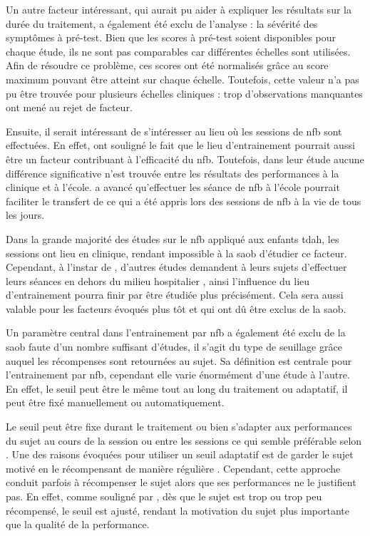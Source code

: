 Un autre facteur intéressant, qui aurait pu aider à expliquer les résultats sur la durée du traitement, a 
également été exclu de l'analyse : la sévérité des symptômes à pré-test. Bien que les scores à pré-test soient disponibles pour chaque étude, ils ne sont pas
comparables car différentes échelles sont utilisées. Afin de résoudre ce problème, ces scores ont été normalisés grâce au score maximum pouvant être atteint
sur chaque échelle. Toutefois, cette valeur n'a pas pu être trouvée pour plusieurs échelles cliniques : trop d'observations manquantes ont mené au rejet de facteur.

Ensuite, il serait intéressant de s'intéresser au lieu où les sessions de \gls{nfb} sont effectuées. En effet, \citet{Minder2018} ont souligné le fait que le lieu
d'entrainement pourrait aussi être un facteur contribuant à l'efficacité du \gls{nfb}. Toutefois, dans leur étude aucune différence significative 
n'est trouvée entre les résultats des performances à la clinique et à l'école. \citet{Vernon2004} a avancé qu'effectuer les séance de \gls{nfb} à l'école
pourrait faciliter le transfert de ce qui a été appris lors des sessions de \gls{nfb} à la vie de tous les jours.

Dans la grande majorité des études sur le \gls{nfb} appliqué aux enfants
\gls{tdah}, les sessions ont lieu en clinique, rendant impossible à la \gls{saob} d'étudier ce facteur. Cependant, à l'instar de \citet{Steiner2014, Minder2018}, 
d'autres études demandent à leurs sujets d'effectuer leurs séances en dehors du milieu hospitalier \citep{Bioulac2019}, ainsi l'influence du lieu d'entrainement 
pourra finir par être étudiée plus précisément. Cela sera aussi valable pour les facteurs évoqués plus tôt et qui ont dû être exclus de la \gls{saob}.

Un paramètre central dans l'entrainement par \gls{nfb} a également été exclu de la \gls{saob} faute d'un nombre suffisant d'études, il s'agit du type de seuillage 
grâce auquel les récompenses sont retournées au sujet. Sa définition est centrale pour l'entrainement par \gls{nfb}, cependant elle varie énormément d'une 
étude à l'autre. En effet, le seuil peut être le même tout au long du traitement ou adaptatif, il peut être fixé manuellement ou automatiquement. 

Le seuil peut être fixe durant le traitement ou bien s'adapter aux performances du sujet au cours de la session ou entre les sessions ce qui semble 
préférable selon \citep{Bauer2016}. Une des raisons évoquées pour utiliser un seuil adaptatif est de garder le sujet motivé en le récompensant de manière régulière 
\citep{Lansbergen2011}. Cependant, cette approche conduit parfois à récompenser le sujet alors que ses performances ne le justifient pas. En effet, comme souligné par \citep{Strehl2014},
dès que le sujet est trop ou trop peu récompensé, le seuil est ajusté, rendant la motivation du sujet plus importante que la qualité de la performance.

